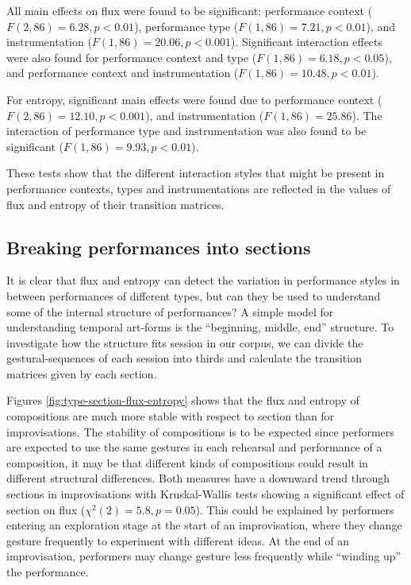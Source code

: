\documentclass{sigchi}
\begin{document}
All main effects on flux were found to be significant: performance
context ($F(2,86) = 6.28, p < 0.01$), performance type ($F(1,86) =
7.21, p < 0.01$), and instrumentation ($F(1,86) = 20.06, p < 0.001$).
Significant interaction effects were also found for performance
context and type ($F(1,86) = 6.18, p < 0.05$), and performance context and
instrumentation ($F(1,86) = 10.48, p < 0.01$).

For entropy, significant main effects were found due to performance
context ($F(2,86) = 12.10, p < 0.001$), and instrumentation ($F(1,86)
= 25.86$). The interaction of performance type and instrumentation was
also found to be significant ($F(1,86) = 9.93, p<0.01$).

These tests show that the different interaction styles that might be
present in performance contexts, types and
instrumentations are reflected in the values of flux and entropy of
their transition matrices.


\subsection{Breaking performances into sections}

It is clear that flux and entropy can detect the variation in
performance styles in between performances of different types, but can
they be used to understand some of the internal structure of
performances? A simple model for understanding temporal art-forms is
the ``beginning, middle, end'' structure. To investigate how the
structure fits session in our corpus, we can divide the
gestural-sequences of each session into thirds and calculate the
transition matrices given by each section.

Figures \ref{fig:type-section-flux-entropy} shows that the flux and
entropy of compositions are much more stable with respect to section
than for improvisations. The stability of compositions is to be
expected since performers are expected to use the same gestures in
each rehearsal and performance of a composition, it may be that
different kinds of compositions could result in different structural
differences. Both measures have a downward trend through sections in
improvisations with Kruskal-Wallis tests showing a significant effect
of section on flux ($\chi^2(2)=5.8, p=0.05$). This could be explained
by performers entering an exploration stage at the start of an
improvisation, where they change gesture frequently to experiment with
different ideas. At the end of an improvisation, performers may change
gesture less frequently while ``winding up'' the performance.
\end{document}
